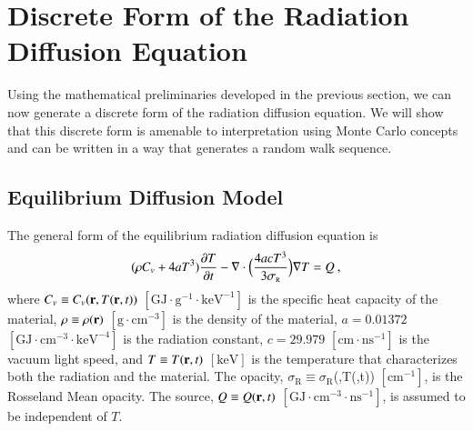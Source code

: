 \documentclass[preprint,12pt]{elsarticle}
\newcommand{\Cv}{\ensuremath{C_{v}}}
\newcommand{\ros}{\ensuremath{\sigma_{\scriptscriptstyle\mathrm{R}}}}
\begin{document}
\section{Discrete Form of the Radiation Diffusion Equation}
\label{sec:discr-form-radi}

Using the mathematical preliminaries developed in the previous section, we can
now generate a discrete form of the radiation diffusion equation. We will show
that this discrete form is amenable to interpretation using Monte Carlo
concepts and can be written in a way that generates a random walk sequence.

\subsection{Equilibrium Diffusion Model}

The general form of the equilibrium radiation diffusion equation is
\cite{morel_1996}
\begin{equation}
  (\rho\Cv + 4aT^{3})\pder{T}{t} -
  \nabla\cdot{\Bigl(\frac{4acT^{3}}{3\ros}\Bigr)\grad{T}} = Q\:,
  \label{eq:eq-diff-T}
\end{equation}
where $\Cv\equiv\Cv(\ve{r},T(\ve{r},t))$
$[\text{GJ}\cdot\text{g}^{-1}\cdot\text{keV}^{-1}]$ is the specific heat
capacity of the material, $\rho\equiv\rho(\mathbf{r})$
$[\text{g}\cdot\text{cm}^{-3}]$ is the density of the material, $a=0.01372$
$[\text{GJ}\cdot\text{cm}^{-3}\cdot\text{keV}^{-4}]$ is the radiation
constant, $c=29.979$ $[\text{cm}\cdot\text{ns}^{-1}]$ is the vacuum light
speed, and $T\equiv T(\mathbf{r},t)$ $[\text{keV}]$ is the temperature that
characterizes both the radiation and the material.  The opacity,
$\ros\equiv\ros$(,T(,t)) $[\text{cm}^{-1}]$, is the Rosseland Mean
opacity.  The source, $Q\equiv Q(\mathbf{r},t)$
$[\text{GJ}\cdot\text{cm}^{-3}\cdot\text{ns}^{-1}]$, is assumed to be
independent of $T$.
\end{document}
